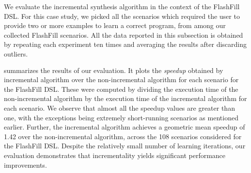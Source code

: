 We evaluate the incremental synthesis algorithm in the context of the FlashFill DSL.
For this case study, we picked all the scenarios which required the user to provide two or more examples to learn a
correct program, from among our collected FlashFill scenarios.
All the data reported in this subsection is obtained by repeating each experiment ten times and averaging the results
after discarding outliers.

 summarizes the results of our evaluation.
It plots the \emph{speedup} obtained by incremental algorithm over the non-incremental algorithm for each scenario for
the FlashFill DSL.
These were computed by dividing the execution time of the non-incremental algorithm by the execution time of the
incremental algorithm for each scenario.
We observe that almost all the speedup values are greater than one, with the exceptions being extremely short-running
scenarios as mentioned earlier.
Further, the incremental algorithm achieves a geometric mean speedup of 1.42 over the non-incremental algorithm, across
the 108 scenarios considered for the FlashFill DSL.
Despite the relatively small number of learning iterations, our evaluation demonstrates that incrementality yields
significant performance improvements.

